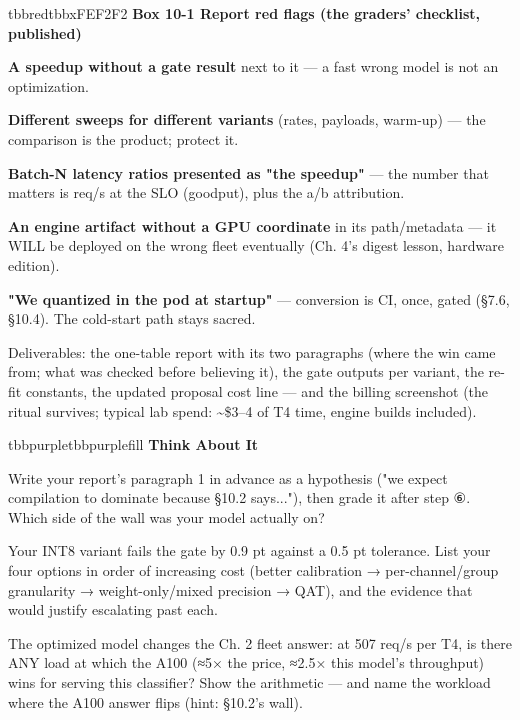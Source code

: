 \begin{calloutbox}{tbbred}{tbbxFEF2F2}
{\normalsize\bfseries\color{tbbx991B1B}Box 10-1  Report red flags (the graders' checklist, published)}\par\vspace{3pt}
\begin{tbbitemize}
  \item \textbf{A speedup without a gate result} next to it — a fast wrong model is not an optimization.
  \item \textbf{Different sweeps for different variants} (rates, payloads, warm-up) — the comparison is the product; protect it.
  \item \textbf{Batch-N latency ratios presented as "the speedup"} — the number that matters is req/s at the SLO (goodput), plus the a/b attribution.
  \item \textbf{An engine artifact without a GPU coordinate} in its path/metadata — it WILL be deployed on the wrong fleet eventually (Ch. 4's digest lesson, hardware edition).
  \item \textbf{"We quantized in the pod at startup"} — conversion is CI, once, gated (§7.6, §10.4). The cold-start path stays sacred.
\end{tbbitemize}
\end{calloutbox}

\vspace{3.0pt}

Deliverables: the one-table report with its two paragraphs (where the win came from; what was checked before believing it), the gate outputs per variant, the re-fit constants, the updated proposal cost line — and the billing screenshot (the ritual survives; typical lab spend: \textasciitilde{}\$3–4 of T4 time, engine builds included).

\begin{calloutbox}{tbbpurple}{tbbpurplefill}
{\normalsize\bfseries\color{tbbpurple}Think About It}\par\vspace{3pt}
\begin{tbbitemize}
  \item Write your report's paragraph 1 in advance as a hypothesis ("we expect compilation to dominate because §10.2 says..."), then grade it after step ⑥. Which side of the wall was your model actually on?
  \item Your INT8 variant fails the gate by 0.9 pt against a 0.5 pt tolerance. List your four options in order of increasing cost (better calibration → per-channel/group granularity → weight-only/mixed precision → QAT), and the evidence that would justify escalating past each.
  \item The optimized model changes the Ch. 2 fleet answer: at 507 req/s per T4, is there ANY load at which the A100 (≈5× the price, ≈2.5× this model's throughput) wins for serving this classifier? Show the arithmetic — and name the workload where the A100 answer flips (hint: §10.2's wall).
\end{tbbitemize}
\end{calloutbox}


